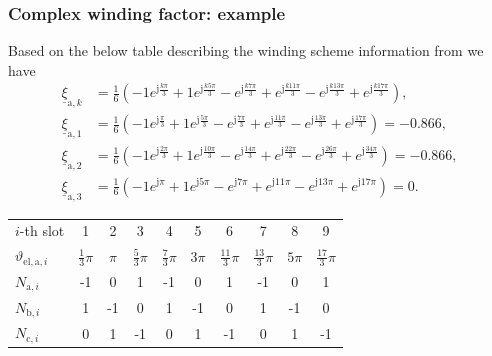 \begin{frame}
	\frametitle{Complex winding factor: example}
    Based on the below table describing the winding scheme information from  we have
    \begin{align*}
        \underline{\xi}_{\mathrm{a},k} &= \frac{1}{6}\left(-1e^{\mathrm{j}\frac{k\pi}{3}} + 1 e^{\mathrm{j}\frac{k5\pi}{3}}-e^{\mathrm{j}\frac{k7\pi}{3}} + e^{\mathrm{j}\frac{k11\pi}{3}} - e^{\mathrm{j}\frac{k13\pi}{3}}+e^{\mathrm{j}\frac{k17\pi}{3}}\right),\\
        \underline{\xi}_{\mathrm{a},1} &= \frac{1}{6}\left(-1e^{\mathrm{j}\frac{\pi}{3}} + 1 e^{\mathrm{j}\frac{5\pi}{3}}-e^{\mathrm{j}\frac{7\pi}{3}} + e^{\mathrm{j}\frac{11\pi}{3}} - e^{\mathrm{j}\frac{13\pi}{3}}+e^{\mathrm{j}\frac{17\pi}{3}}\right) = -0.866,\\
        \underline{\xi}_{\mathrm{a},2} &= \frac{1}{6}\left(-1e^{\mathrm{j}\frac{2\pi}{3}} + 1 e^{\mathrm{j}\frac{10\pi}{3}}-e^{\mathrm{j}\frac{14\pi}{3}} + e^{\mathrm{j}\frac{22\pi}{3}} - e^{\mathrm{j}\frac{26\pi}{3}}+e^{\mathrm{j}\frac{34\pi}{3}}\right) = -0.866,\\
        \underline{\xi}_{\mathrm{a},3} &= \frac{1}{6}\left(-1e^{\mathrm{j}\pi} + 1 e^{\mathrm{j}5\pi}-e^{\mathrm{j}7\pi} + e^{\mathrm{j}11\pi} - e^{\mathrm{j}13\pi}+e^{\mathrm{j}17\pi}\right) = 0.
    \end{align*}
    \begin{table}
        \centering
        \begin{tabular}{l c c c c c c c c c}
            \toprule
           $i$-th slot & 1 & 2 & 3 & 4 & 5 & 6 & 7 & 8 & 9 \\ 
           $\vartheta_{\mathrm{el},\mathrm{a},i}$ & $\frac{1}{3}\pi$ & $\pi$ & $\frac{5}{3}\pi$ & $\frac{7}{3}\pi$ & $3\pi$ & $\frac{11}{3}\pi$ & $\frac{13}{3}\pi$ & $5\pi$ & $\frac{17}{3}\pi$\\ 
           \midrule
              $N_{\mathrm{a},i}$ & -1 & 0 & 1 & -1 & 0 & 1 & -1 & 0 & 1\\
              $N_{\mathrm{b},i}$ & 1 & -1 & 0 & 1 & -1 & 0 & 1 & -1 & 0\\
                $N_{\mathrm{c},i}$ & 0 & 1 & -1 & 0 & 1 & -1 & 0 & 1 & -1\\
            \bottomrule
        \end{tabular}
    \end{table}
\end{frame}